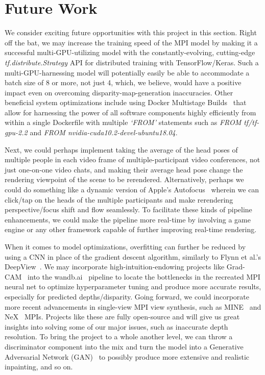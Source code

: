 \section{Future Work}\label{sec:future-work}

We consider exciting future opportunities with this project in this section. Right off the bat, we may increase the training speed of the MPI model by making it a successful multi-GPU-utilizing model with the constantly-evolving, cutting-edge \textit{tf.distribute.Strategy} API for distributed training with TensorFlow/Keras. Such a multi-GPU-harnessing model will potentially easily be able to accommodate a batch size of 8 or more, not just 4, which, we believe, would have a positive impact even on overcoming disparity-map-generation inaccuracies. Other beneficial system optimizations include using Docker Multistage Builds~\cite{noauthor_advanced_2020} that allow for harnessing the power of all software components highly efficiently from within a single Dockerfile with multiple \textit{`FROM'} statements such as \textit{FROM tf/tf-gpu-2.2} and \textit{FROM nvidia-cuda10.2-devel-ubuntu18.04}.

Next, we could perhaps implement taking the average of the head poses of multiple people in each video frame of multiple-participant video conferences, not just one-on-one video chats, and making their average head pose change the rendering viewpoint of the scene to be rerendered. Alternatively, perhaps we could do something like a dynamic version of Apple's Autofocus~\cite{noauthor_avcapturedevicefocusmodeautofocus_nodate} wherein we can click/tap on the heads of the multiple participants and make rerendering perspective/focus shift and flow seamlessly. To facilitate these kinds of pipeline enhancements, we could make the pipeline more real-time by involving a game engine or any other framework capable of further improving real-time rendering.

When it comes to model optimizations, overfitting can further be reduced by using a CNN in place of the gradient descent algorithm, similarly to Flynn et al.'s DeepView~\cite{flynn_deepview_2019}. We may incorporate high-intuition-endowing projects like Grad-CAM~\cite{selvaraju_grad-cam_2020} into the wandb.ai~\cite{wandb} pipeline to locate the bottlenecks in the recreated MPI neural net to optimize hyperparameter tuning and produce more accurate results, especially for predicted depths/disparity. Going forward, we could incorporate more recent advancements in single-view MPI view synthesis, such as MINE~\cite{li_mine_2021} and NeX~\cite{wizadwongsa_nex_2021} MPIs. Projects like these are fully open-source and will give us great insights into solving some of our major issues, such as inaccurate depth resolution. To bring the project to a whole another level, we can throw a discriminator component into the mix and turn the model into a Generative Adversarial Network (GAN)~\cite{goodfellow_generative_2014} to possibly produce more extensive and realistic inpainting, and so on. 
	
